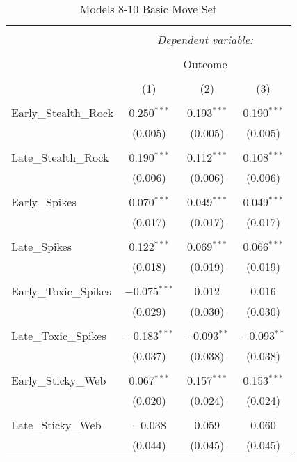 \documentclass[12pt,twoside]{reedthesis}
\begin{document}
  \begin{table}[!htbp] \centering 
    \caption{Models 8-10 Basic Move Set} 
    \label{} 
  \begin{tabular}{@{\extracolsep{5pt}}lccc} 
  \\[-1.8ex]\hline 
  \hline \\[-1.8ex] 
   & \multicolumn{3}{c}{\textit{Dependent variable:}} \\ 
  \cline{2-4} 
  \\[-1.8ex] & \multicolumn{3}{c}{Outcome} \\ 
  \\[-1.8ex] & (1) & (2) & (3)\\ 
  \hline \\[-1.8ex] 
   Early\_Stealth\_Rock & 0.250$^{***}$ & 0.193$^{***}$ & 0.190$^{***}$ \\ 
    & (0.005) & (0.005) & (0.005) \\ 
    & & & \\ 
   Late\_Stealth\_Rock & 0.190$^{***}$ & 0.112$^{***}$ & 0.108$^{***}$ \\ 
    & (0.006) & (0.006) & (0.006) \\ 
    & & & \\ 
   Early\_Spikes & 0.070$^{***}$ & 0.049$^{***}$ & 0.049$^{***}$ \\ 
    & (0.017) & (0.017) & (0.017) \\ 
    & & & \\ 
   Late\_Spikes & 0.122$^{***}$ & 0.069$^{***}$ & 0.066$^{***}$ \\ 
    & (0.018) & (0.019) & (0.019) \\ 
    & & & \\ 
   Early\_Toxic\_Spikes & $-$0.075$^{***}$ & 0.012 & 0.016 \\ 
    & (0.029) & (0.030) & (0.030) \\ 
    & & & \\ 
   Late\_Toxic\_Spikes & $-$0.183$^{***}$ & $-$0.093$^{**}$ & $-$0.093$^{**}$ \\ 
    & (0.037) & (0.038) & (0.038) \\ 
    & & & \\ 
   Early\_Sticky\_Web & 0.067$^{***}$ & 0.157$^{***}$ & 0.153$^{***}$ \\ 
    & (0.020) & (0.024) & (0.024) \\ 
    & & & \\ 
   Late\_Sticky\_Web & $-$0.038 & 0.059 & 0.060 \\ 
    & (0.044) & (0.045) & (0.045) \\ 

\end{tabular}
\end{table}
\end{document}
